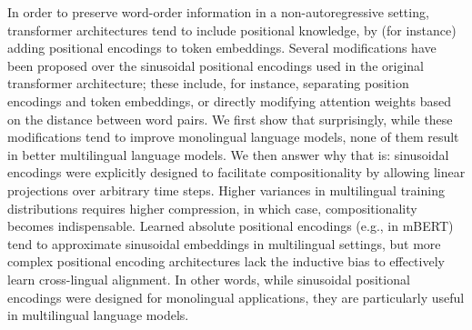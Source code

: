 In order to preserve word-order information in a non-autoregressive setting, transformer architectures tend to include positional knowledge, by (for instance) adding positional encodings to token embeddings. Several modifications have been proposed over the sinusoidal positional encodings used in the original transformer architecture; these include, for instance, separating position encodings and token embeddings, or directly modifying attention weights based on the distance between word pairs. We first show that surprisingly, while these modifications tend to improve monolingual language models, none of them result in better multilingual language models. We then answer why that is: sinusoidal encodings were explicitly designed to facilitate compositionality by allowing linear projections over arbitrary time steps. Higher variances in multilingual training distributions requires higher compression, in which case, compositionality becomes indispensable. Learned absolute positional encodings (e.g., in mBERT) tend to approximate sinusoidal embeddings in multilingual settings, but more complex positional encoding architectures lack the inductive bias to effectively learn cross-lingual alignment. In other words, while sinusoidal positional encodings were designed for monolingual applications, they are particularly useful in multilingual language models.
